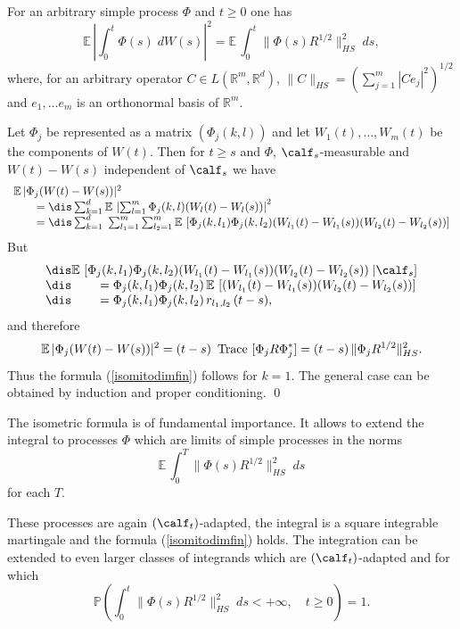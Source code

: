 \documentclass[preprint]{imsart}
\def\P{\mathbb P}
\def\E{\mathbb E}
\def\R{\mathbb R}
\begin{document}
{\begin{Proposition}
  For an arbitrary simple process $\Phi$ and $t\ge0$ one has
\begin{equation}\label{isomitodimfin}
  \E\,\left|\int_0^t \Phi(s)\; dW(s)\right|^2
  =\E\,\int_0^t \|\Phi(s)R^{1/2}\|_{HS}^2\; ds,
\end{equation}
  where, for an arbitrary operator $C\in L(\R^m,\R^d)$,
$  \|C\|_{HS}= \left(\sum_{j=1}^m |Ce_j|^2\right)^{1/2}$ and
$e_1,\ldots e_m$ is an orthonormal basis of $\R^m$.
\end{Proposition}

Let $\Phi_j$ be represented as a matrix $(\Phi_j(k,l))$ and let
$W_1(t),\ldots ,W_m(t)$ be the components of $W(t)$. Then for
$t\ge s$ and $\Phi$, $\calf_s$-measurable and $W(t)-W(s)$
independent of $\calf_s$ we have
$$
\begin{array}{l}
  \E\, |\Phi_j(W(t)-W(s))|^2 \\
  \qquad =  \dis
\sum_{k=1}^d\E\, \left|\sum_{l=1}^m
\Phi_j(k,l)(W_l(t)-W_l(s))\right|^2
   \\
\qquad = \dis
\sum_{k=1}^d\; \sum_{l_1=1}^m\sum_{l_2=1}^m\E\, \left[
\Phi_j(k,l_1)\Phi_j(k,l_2)(W_{l_1}(t)-W_{l_1}(s))
(W_{l_2}(t)-W_{l_2}(s))\right]
\end{array}
$$
But
$$
\begin{array}{l}
\dis
\E\, \left[
\Phi_j(k,l_1)\Phi_j(k,l_2)(W_{l_1}(t)-W_{l_1}(s))
(W_{l_2}(t)-W_{l_2}(s))\; \vert \calf_s\right]
\\\dis
\qquad =
\Phi_j(k,l_1)\Phi_j(k,l_2)\,
\E\, \left[
(W_{l_1}(t)-W_{l_1}(s))
(W_{l_2}(t)-W_{l_2}(s))\right]
\\\dis
\qquad =
\Phi_j(k,l_1)\Phi_j(k,l_2)\,
r_{l_1,l_2} \, (t-s),
\end{array}
$$
and therefore
$$
 \E\, |\Phi_j(W(t)-W(s))|^2 =
 (t-s)\, {\rm \ Trace}\
 [\Phi_jR\Phi_j^*] =
  (t-s)\, \|\Phi_jR^{1/2}\|^2_{HS}.
$$
Thus the formula (\ref{isomitodimfin}) follows for $k=1$. The
general case can be obtained by induction and proper conditioning.
\qed

The isometric formula is of fundamental importance. It allows to
extend the integral to processes $\Phi$ which are limits of simple
processes in the norms
$$
\E\,\int_0^T \|\Phi(s)R^{1/2}\|_{HS}^2\; ds
$$
for each $T$.

These processes are again $(\calf_t)$-adapted, the integral is a
square integrable martingale and
the formula (\ref{isomitodimfin}) holds.
The integration can be extended to even larger classes of
integrands which are $(\calf_t)$-adapted and for which
$$
\P\left( \int_0^t \|\Phi(s)R^{1/2}\|_{HS}^2\; ds<+\infty,
\quad t\ge 0\right)=1.
$$

}
\end{document}
